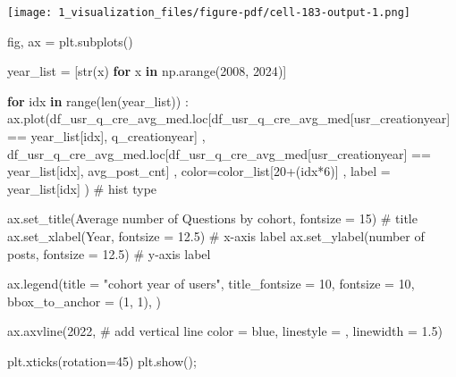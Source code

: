 \documentclass[
  letterpaper,
  DIV=11,
  numbers=noendperiod]{scrartcl}
\newenvironment{Shaded}{\begin{snugshade}}{\end{snugshade}}
\newcommand{\BuiltInTok}[1]{\textcolor[rgb]{0.00,0.23,0.31}{#1}}
\newcommand{\CommentTok}[1]{\textcolor[rgb]{0.37,0.37,0.37}{#1}}
\newcommand{\ControlFlowTok}[1]{\textcolor[rgb]{0.00,0.23,0.31}{\textbf{#1}}}
\newcommand{\DecValTok}[1]{\textcolor[rgb]{0.68,0.00,0.00}{#1}}
\newcommand{\FloatTok}[1]{\textcolor[rgb]{0.68,0.00,0.00}{#1}}
\newcommand{\KeywordTok}[1]{\textcolor[rgb]{0.00,0.23,0.31}{\textbf{#1}}}
\newcommand{\NormalTok}[1]{\textcolor[rgb]{0.00,0.23,0.31}{#1}}
\newcommand{\OperatorTok}[1]{\textcolor[rgb]{0.37,0.37,0.37}{#1}}
\newcommand{\StringTok}[1]{\textcolor[rgb]{0.13,0.47,0.30}{#1}}
\begin{document}
\texttt{[image: 1\_visualization\_files/figure-pdf/cell-183-output-1.png]}

\begin{Shaded}
\begin{Highlighting}[]
\NormalTok{fig, ax }\OperatorTok{=}\NormalTok{ plt.subplots()}

\NormalTok{year\_list }\OperatorTok{=}\NormalTok{ [}\BuiltInTok{str}\NormalTok{(x) }\ControlFlowTok{for}\NormalTok{ x }\KeywordTok{in}\NormalTok{ np.arange(}\DecValTok{2008}\NormalTok{, }\DecValTok{2024}\NormalTok{)]}

\ControlFlowTok{for}\NormalTok{ idx }\KeywordTok{in} \BuiltInTok{range}\NormalTok{(}\BuiltInTok{len}\NormalTok{(year\_list)) :}
\NormalTok{  ax.plot(df\_usr\_q\_cre\_avg\_med.loc[df\_usr\_q\_cre\_avg\_med[}\StringTok{\textquotesingle{}usr\_creationyear\textquotesingle{}}\NormalTok{] }\OperatorTok{==}\NormalTok{ year\_list[idx], }\StringTok{\textquotesingle{}q\_creationyear\textquotesingle{}}\NormalTok{]}
\NormalTok{       ,  df\_usr\_q\_cre\_avg\_med.loc[df\_usr\_q\_cre\_avg\_med[}\StringTok{\textquotesingle{}usr\_creationyear\textquotesingle{}}\NormalTok{] }\OperatorTok{==}\NormalTok{ year\_list[idx], }\StringTok{\textquotesingle{}avg\_post\_cnt\textquotesingle{}}\NormalTok{]}
\NormalTok{       ,  color}\OperatorTok{=}\NormalTok{color\_list[}\DecValTok{20}\OperatorTok{+}\NormalTok{(idx}\OperatorTok{*}\DecValTok{6}\NormalTok{)]}
\NormalTok{      , label }\OperatorTok{=}\NormalTok{ year\_list[idx]}
\NormalTok{        ) }\CommentTok{\# hist type}


\NormalTok{ax.set\_title(}\StringTok{\textquotesingle{}Average number of Questions by cohort\textquotesingle{}}\NormalTok{, fontsize }\OperatorTok{=} \DecValTok{15}\NormalTok{) }\CommentTok{\# title}
\NormalTok{ax.set\_xlabel(}\StringTok{\textquotesingle{}Year\textquotesingle{}}\NormalTok{, fontsize }\OperatorTok{=} \FloatTok{12.5}\NormalTok{) }\CommentTok{\# x{-}axis label}
\NormalTok{ax.set\_ylabel(}\StringTok{\textquotesingle{}number of posts\textquotesingle{}}\NormalTok{, fontsize }\OperatorTok{=} \FloatTok{12.5}\NormalTok{) }\CommentTok{\# y{-}axis label}

\NormalTok{ax.legend(title }\OperatorTok{=} \StringTok{"cohort year of users"}\NormalTok{,}
\NormalTok{          title\_fontsize }\OperatorTok{=} \DecValTok{10}\NormalTok{, fontsize }\OperatorTok{=} \DecValTok{10}\NormalTok{,}
\NormalTok{          bbox\_to\_anchor }\OperatorTok{=}\NormalTok{ (}\DecValTok{1}\NormalTok{, }\DecValTok{1}\NormalTok{), }
\NormalTok{          )}

\NormalTok{ax.axvline(}\StringTok{\textquotesingle{}2022\textquotesingle{}}\NormalTok{, }\CommentTok{\# add vertical line}
\NormalTok{           color }\OperatorTok{=} \StringTok{\textquotesingle{}blue\textquotesingle{}}\NormalTok{,}
\NormalTok{           linestyle }\OperatorTok{=} \StringTok{\textquotesingle{}{-}{-}\textquotesingle{}}\NormalTok{,}
\NormalTok{           linewidth }\OperatorTok{=} \FloatTok{1.5}\NormalTok{)}


\NormalTok{plt.xticks(rotation}\OperatorTok{=}\DecValTok{45}\NormalTok{)}
\NormalTok{plt.show()}\OperatorTok{;}
\end{Highlighting}
\end{Shaded}
\end{document}
